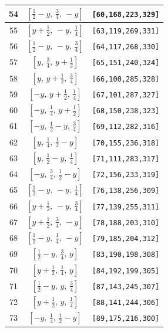 \documentclass[fleqn,8pt]{jsarticle}
\begin{document}
\begin{longtable}{ccc}
54 & $\left[ \frac{1}{2} - y,\, \frac{3}{4},\, - y \right]$ & {\tt [60,168,223,329]} \\ \hline
55 & $\left[ y + \frac{1}{2},\, - y,\, \frac{1}{4} \right]$ & {\tt [63,119,269,331]} \\ \hline
56 & $\left[ \frac{1}{2} - y,\, - y,\, \frac{3}{4} \right]$ & {\tt [64,117,268,330]} \\ \hline
57 & $\left[ y,\, \frac{3}{4},\, y + \frac{1}{2} \right]$ & {\tt [65,151,240,324]} \\ \hline
58 & $\left[ y,\, y + \frac{1}{2},\, \frac{3}{4} \right]$ & {\tt [66,100,285,328]} \\ \hline
59 & $\left[ - y,\, y + \frac{1}{2},\, \frac{1}{4} \right]$ & {\tt [67,101,287,327]} \\ \hline
60 & $\left[ - y,\, \frac{1}{4},\, y + \frac{1}{2} \right]$ & {\tt [68,150,238,323]} \\ \hline
61 & $\left[ - y,\, \frac{1}{2} - y,\, \frac{3}{4} \right]$ & {\tt [69,112,282,316]} \\ \hline
62 & $\left[ y,\, \frac{1}{4},\, \frac{1}{2} - y \right]$ & {\tt [70,155,236,318]} \\ \hline
63 & $\left[ y,\, \frac{1}{2} - y,\, \frac{1}{4} \right]$ & {\tt [71,111,283,317]} \\ \hline
64 & $\left[ - y,\, \frac{3}{4},\, \frac{1}{2} - y \right]$ & {\tt [72,156,233,319]} \\ \hline
65 & $\left[ \frac{1}{2} - y,\, - y,\, \frac{1}{4} \right]$ & {\tt [76,138,256,309]} \\ \hline
66 & $\left[ y + \frac{1}{2},\, - y,\, \frac{3}{4} \right]$ & {\tt [77,139,255,311]} \\ \hline
67 & $\left[ y + \frac{1}{2},\, \frac{3}{4},\, - y \right]$ & {\tt [78,188,203,310]} \\ \hline
68 & $\left[ \frac{1}{2} - y,\, \frac{1}{4},\, - y \right]$ & {\tt [79,185,204,312]} \\ \hline
69 & $\left[ \frac{1}{2} - y,\, \frac{3}{4},\, y \right]$ & {\tt [83,190,198,308]} \\ \hline
70 & $\left[ y + \frac{1}{2},\, \frac{1}{4},\, y \right]$ & {\tt [84,192,199,305]} \\ \hline
71 & $\left[ \frac{1}{2} - y,\, y,\, \frac{3}{4} \right]$ & {\tt [87,143,245,307]} \\ \hline
72 & $\left[ y + \frac{1}{2},\, y,\, \frac{1}{4} \right]$ & {\tt [88,141,244,306]} \\ \hline
73 & $\left[ - y,\, \frac{1}{4},\, \frac{1}{2} - y \right]$ & {\tt [89,175,216,300]} \\ \hline

\end{longtable}
\end{document}
